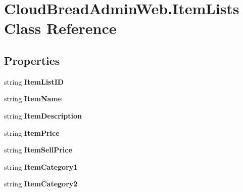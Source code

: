 \hypertarget{a00127}{}\section{Cloud\+Bread\+Admin\+Web.\+Item\+Lists Class Reference}
\label{a00127}
\subsection*{Properties}
\begin{DoxyCompactItemize}
\item 
string {\bfseries Item\+List\+ID}\hypertarget{a00127_aef30485acfa501623200c6cea60c653c}{}\label{a00127_aef30485acfa501623200c6cea60c653c}

\item 
string {\bfseries Item\+Name}\hypertarget{a00127_acf1f8543fd3893e67f336b8a3f2e2acf}{}\label{a00127_acf1f8543fd3893e67f336b8a3f2e2acf}

\item 
string {\bfseries Item\+Description}\hypertarget{a00127_ace98eb34ef0012970ad9ae49492f8c45}{}\label{a00127_ace98eb34ef0012970ad9ae49492f8c45}

\item 
string {\bfseries Item\+Price}\hypertarget{a00127_ac63bec8c4fff2ff8b882871448e76f51}{}\label{a00127_ac63bec8c4fff2ff8b882871448e76f51}

\item 
string {\bfseries Item\+Sell\+Price}\hypertarget{a00127_aa6859385a15234c0a4bf2274938ee407}{}\label{a00127_aa6859385a15234c0a4bf2274938ee407}

\item 
string {\bfseries Item\+Category1}\hypertarget{a00127_af0ebb97c99e6254427954506d5ccb197}{}\label{a00127_af0ebb97c99e6254427954506d5ccb197}

\item 
string {\bfseries Item\+Category2}\hypertarget{a00127_aefb1422727d88bcf6bc3e48d1364d62c}{}\label{a00127_aefb1422727d88bcf6bc3e48d1364d62c}


\end{DoxyCompactItemize}
